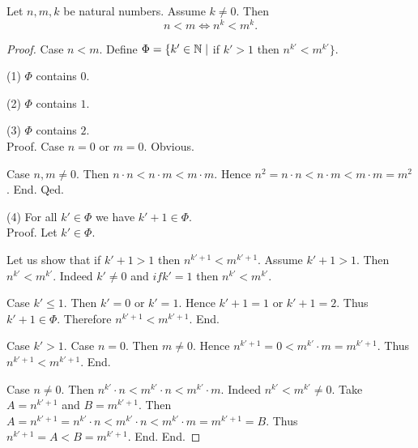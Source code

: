 \documentclass[10pt]{article}
\begin{document}
  \begin{forthel}
    \begin{proposition}
      Let $n, m, k$ be natural numbers.
      Assume $k \neq 0$.
      Then \[ n < m \iff n^{k} < m^{k}. \]
    \end{proposition}
    \begin{proof}
      Case $n < m$.
        Define $\Phi = \{ k' \in \mathbb{N} \mid$ if $k' > 1$ then
        $n^{k'} < m^{k'} \}$.

        (1) $\Phi$ contains $0$.

        (2) $\Phi$ contains $1$.

        (3) $\Phi$ contains $2$. \\
        Proof.
          Case $n = 0$ or $m = 0$. Obvious.

          Case $n, m \neq 0$.
            Then $n \cdot n
              < n \cdot m
              < m \cdot m$.
            Hence $n^{2}
              = n \cdot n
              < n \cdot m
              < m \cdot m
              = m^{2}$.
          End.
        Qed.

        (4) For all $k' \in \Phi$ we have $k' + 1 \in \Phi$. \\
        Proof.
          Let $k' \in \Phi$.

          Let us show that if $k' + 1 > 1$ then
          $n^{k' + 1} < m^{k' + 1}$.
            Assume $k' + 1 > 1$.
            Then $n^{k'} < m^{k'}$.
            Indeed $k' \neq 0$ and $if k' = 1$ then $n^{k'} < m^{k'}$.

            Case $k' \leq 1$.
              Then $k' = 0$ or $k' = 1$.
              Hence $k' + 1 = 1$ or $k' + 1 = 2$.
              Thus $k' + 1 \in \Phi$.
              Therefore $n^{k' + 1} < m^{k' + 1}$.
            End.

            Case $k' > 1$.
              Case $n = 0$.
                Then $m \neq 0$.
                Hence $n^{k' + 1}
                  = 0
                  < m^{k'} \cdot m
                  = m^{k' + 1}$.
                Thus $n^{k' + 1} < m^{k' + 1}$.
              End.

              Case $n \neq 0$.
                Then $n^{k'} \cdot n
                  < m^{k'} \cdot n
                  < m^{k'} \cdot m$.
                Indeed $n^{k'} < m^{k'} \neq 0$.
                Take $A = n^{k' + 1}$ and $B = m^{k' + 1}$. %
                Then $A
                  = n^{k' + 1}
                  = n^{k'} \cdot n
                  < m^{k'} \cdot n
                  < m^{k'} \cdot m
                  = m^{k' + 1}
                  = B$.
                Thus $n^{k' + 1} = A < B = m^{k' + 1}$.
              End.
            End.


\end{proof}
\end{forthel}
\end{document}

